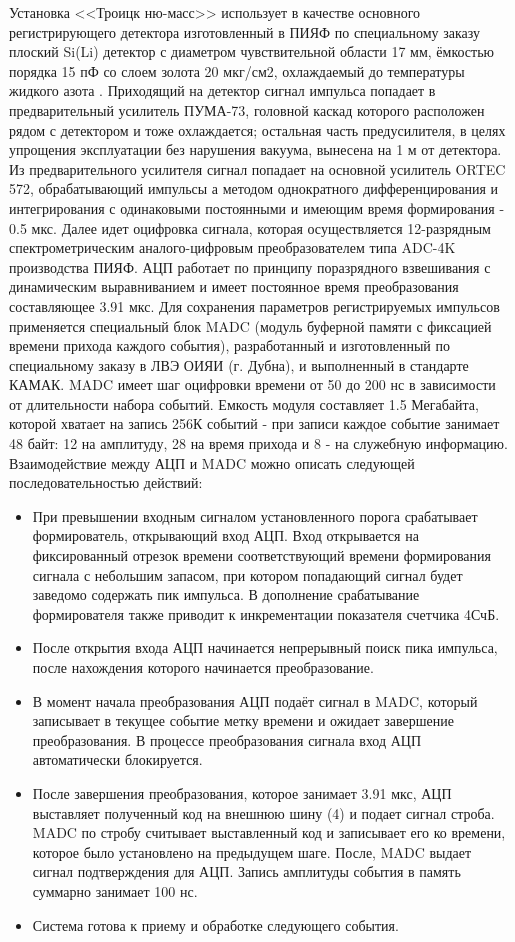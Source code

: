 \documentclass[a4paper,14pt]{extreport}
\begin{document}
Установка <<Троицк ню-масс>> использует в качестве основного регистрирующего детектора изготовленный в ПИЯФ по специальному заказу плоский Si(Li) детектор с диаметром чувствительной области 17 мм, ёмкостью порядка 15 пФ со слоем золота 20 мкг/см2, охлаждаемый до температуры жидкого азота . Приходящий на детектор сигнал импульса попадает в предварительный усилитель ПУМА-73, головной каскад которого расположен рядом с детектором и тоже охлаждается; остальная часть предусилителя, в целях упрощения эксплуатации без нарушения вакуума, вынесена на 1 м от детектора. Из предварительного усилителя сигнал попадает на основной усилитель ORTEC 572, обрабатывающий импульсы а методом однократного дифференцирования и интегрирования с одинаковыми постоянными и имеющим время формирования - 0.5 мкс. Далее идет оцифровка сигнала, которая осуществляется 12-разрядным спектрометрическим аналого-цифровым преобразователем типа ADC-4K производства ПИЯФ. АЦП работает по принципу поразрядного взвешивания с динамическим выравниванием и имеет постоянное время преобразования составляющее 3.91 мкс. Для сохранения параметров регистрируемых импульсов применяется специальный блок MADC (модуль буферной памяти с фиксацией времени прихода каждого события), разработанный и изготовленный по специальному заказу в ЛВЭ ОИЯИ (г. Дубна), и выполненный в стандарте КАМАК. MADC имеет шаг оцифровки времени от 50 до 200 нс в зависимости от длительности набора событий. Емкость модуля составляет 1.5 Мегабайта, которой хватает на запись 256К событий - при записи каждое событие занимает 48 байт: 12 на амплитуду, 28 на время прихода и 8 - на служебную информацию.
Взаимодействие между АЦП и MADC можно описать следующей последовательностью действий:
\begin{itemize}
    \item При превышении входным сигналом установленного порога срабатывает     формирователь, открывающий вход АЦП. Вход открывается на фиксированный отрезок времени соответствующий времени  формирования сигнала с небольшим запасом, при котором попадающий сигнал будет заведомо содержать пик импульса. В дополнение срабатывание формирователя также приводит к инкрементации показателя счетчика  4СчБ.
    \item После открытия входа АЦП начинается непрерывный поиск пика импульса, после нахождения которого начинается преобразование.
    \item В момент начала преобразования АЦП подаёт сигнал в MADC, который записывает в текущее событие метку времени и ожидает завершение преобразования. В процессе преобразования сигнала вход АЦП автоматически блокируется.
    \item После завершения преобразования, которое занимает 3.91 мкс, АЦП выставляет полученный код на внешнюю шину (4) и подает сигнал строба. MADC по стробу считывает выставленный код и записывает его ко времени, которое было установлено на предыдущем шаге. После, MADC выдает сигнал подтверждения для АЦП. Запись амплитуды события в память суммарно занимает 100 нс.
    \item Система готова к приему и обработке следующего события.
\end{itemize}
\end{document}
